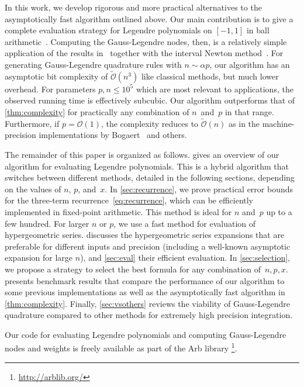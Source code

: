 \documentclass[nohypdvips,review]{siamart0216}
\newcommand{\OO}{\mathcal{O}}
\newcommand{\OOtilde}{\widetilde{\mathcal{O}}}
\begin{document}
In this work, we develop rigorous and more practical alternatives to the
asymptotically fast algorithm outlined above.
Our main contribution is to give a complete evaluation strategy
for Legendre polynomials on $[-1,1]$ in ball arithmetic~\cite{vdH:ball,Johansson2017arb}.
Computing the Gauss-Legendre nodes, then,
is a relatively simple application of the results
in~\cite{petras1999computation} together with
the interval Newton method~\cite{moore1979methods}.
For generating Gauss-Legendre quadrature rules with $n \sim \alpha p$,
our algorithm has an asymptotic bit complexity of $\OOtilde(n^3)$ like
classical methods, but much lower overhead.
For parameters $p, n \leq 10^5$ which are most relevant to
applications, the observed running time is effectively subcubic.
Our algorithm outperforms that of \cref{thm:complexity} for
practically any combination of $n$~and~$p$ in that range.
Furthermore, if $p = \OO(1)$, the complexity reduces to $\OOtilde(n)$
as in the machine-precision implementations by
Bogaert~\cite{bogaert2014iteration} and others.

The remainder of this paper is organized as follows.
 gives an overview of our algorithm for evaluating
Legendre polynomials.
This is a hybrid algorithm that switches between different methods,
detailed in the following sections, depending on the values of $n$, $p$,
and~$x$.
In \cref{sec:recurrence}, we prove practical error bounds for
the three-term recurrence~\cref{eq:recurrence}, which can be
efficiently implemented in fixed-point arithmetic.
This method is ideal for $n$ and~$p$ up to a few hundred.
For larger $n$ or $p$, we use a fast method for evaluation
of hypergeometric series.
 discusses the hypergeometric series
expansions that are preferable for different inputs and precision
(including a well-known asymptotic expansion for large $n$),
and \cref{sec:eval} their efficient evaluation.
In \cref{sec:selection}, we propose a strategy to select the
best formula for any combination of~$n, p, x$.
 presents benchmark results that compare the performance
of our algorithm to some previous implementations as well as the
asymptotically fast algorithm in \cref{thm:complexity}.
Finally, \cref{sec:vsothers} reviews the viability of Gauss-Legendre
quadrature compared to other methods
for extremely high precision integration.

Our code for evaluating Legendre polynomials and computing
Gauss-Legendre nodes and weights is freely available as part of
the Arb library \cite{Johansson2017arb}%
\footnote{\url{http://arblib.org/}}.
\end{document}
